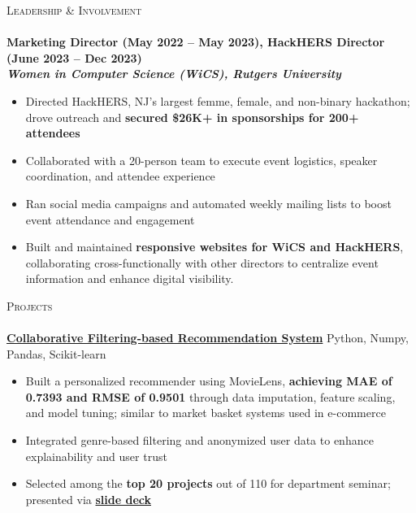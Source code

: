 \documentclass[a4paper]{article}
\newcommand{\lineunder} {
    \vspace*{-8pt} \\
    \hspace*{-18pt} \hrulefill \\
}
\newcommand{\header} [1] {
    {\hspace*{-18pt}\vspace*{6pt} \textsc{#1}}
    \vspace*{-6pt} \lineunder
}
\begin{document}
%
%
\header{Leadership \& Involvement}
\textbf{Marketing Director (May 2022 – May 2023), HackHERS Director (June 2023 – Dec 2023)} \\
\textit{\textbf{Women in Computer Science (WiCS), Rutgers University}}
\vspace{-2.5mm}
\begin{itemize} \itemsep -4pt
  \item Directed HackHERS, NJ’s largest femme, female, and non-binary hackathon; drove outreach and \textbf{secured \$26K+ in sponsorships for 200+ attendees}
  \item Collaborated with a 20-person team to execute event logistics, speaker coordination, and attendee experience
  \item Ran social media campaigns and automated weekly mailing lists to boost event attendance and engagement
  \item Built and maintained \textbf{responsive websites for WiCS and HackHERS}, collaborating cross-functionally with other directors to centralize event information and enhance digital visibility.
\end{itemize}
\vspace{-2mm}

%
%
\header{Projects}

\textbf{\href{https://github.com/ShatakshiRanjan/Recommendation-systems}{Collaborative Filtering-based Recommendation System}} \hfill Python, Numpy, Pandas, Scikit-learn
\vspace{-2.5mm}
\begin{itemize} \itemsep -4pt
\item Built a personalized recommender using MovieLens, \textbf{achieving MAE of 0.7393 and RMSE of 0.9501} through data imputation, feature scaling, and model tuning; similar to market basket systems used in e-commerce
\item Integrated genre-based filtering and anonymized user data to enhance explainability and user trust
\item Selected among the \textbf{top 20 projects} out of 110 for department seminar; presented via \textbf{\href{https://docs.google.com/presentation/d/1r65Cy6-eKkuGI6xonAQxm5vqnZ0_YV5kaQh9pkjvJF0/edit?usp=sharing}{slide deck}}
\end{itemize}
\vspace{-1mm}
\end{document}
